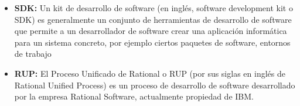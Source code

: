 \begin{itemize}
 \item \textbf{SDK:} Un kit de desarrollo de software (en inglés, software development kit o SDK) es generalmente un conjunto de herramientas de desarrollo de software que permite a un desarrollador de software crear una aplicación informática para un sistema concreto, por ejemplo ciertos paquetes de software, entornos de trabajo
 \item \textbf{RUP:} El Proceso Unificado de Rational o RUP (por sus siglas en inglés de Rational Unified Process) es un proceso de desarrollo de software desarrollado por la empresa Rational Software, actualmente propiedad de IBM.
\end{itemize}
